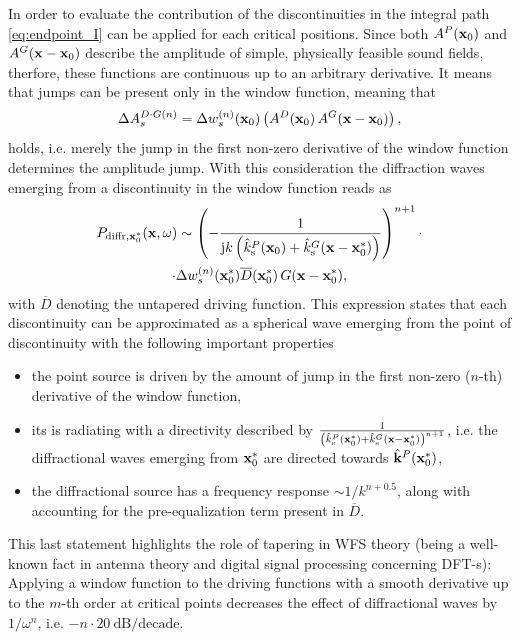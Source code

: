 \documentclass[lettersize,journal]{IEEEtran}
\begin{document}
In order to evaluate the contribution of the discontinuities in the integral path \eqref{eq:endpoint_I} can be applied for each critical positions.
Since both $A^P(\mathbf{x}_0)$ and $A^G(\mathbf{x}-\mathbf{x}_0)$ describe the amplitude of simple, physically feasible sound fields, therfore, these functions are continuous up to an arbitrary derivative. 
It means that jumps can be present only in the window function, meaning that 
\begin{equation}
  \Delta A^{D\cdot G (n)}_s =  \Delta w^{(n)}_s(\mathbf{x}_0) \left( A^D(\mathbf{x}_0) \, A^G(\mathbf{x}-\mathbf{x}_0) \right),
\end{equation}
holds, i.e. merely the jump in the first non-zero derivative of the window function determines the amplitude jump.
With this consideration the diffraction waves emerging from a discontinuity in the window function reads as
\begin{multline}
  \small
  P_{\mathrm{diffr,\mathbf{x}_0^*}}(\mathbf{x},\omega) \sim\left( -\frac{1}{\mathrm{j} k \left(\hat{k}_\mathrm{s}^P(\mathbf{x}_0)+\hat{k}_\mathrm{s}^G(\mathbf{x}-\mathbf{x}_0^*)\right)} \right)^{n+1} \cdot \\ 
  \cdot \Delta w^{(n)}_s(\mathbf{x}_0^*) \overline{D}(\mathbf{x}_0^*) \, G(\mathbf{x}-\mathbf{x}_0^*)
  ,
  \label{eq:diffr_waves}
\end{multline}
with $\overline{D}$ denoting the untapered driving function.
This expression states that each discontinuity can be approximated as a spherical wave emerging from the point of discontinuity with the following important properties
\begin{itemize}
  \item the point source is driven by the amount of jump in the first non-zero ($n$-th) derivative of the window function,
  \item its is radiating with a directivity described by $\frac{1}{\left(\hat{k}_\mathrm{s}^P(\mathbf{x}_0^*)+\hat{k}_\mathrm{s}^G(\mathbf{x}-\mathbf{x}_0^*)\right)^{n+1}}$, i.e. the diffractional waves emerging from $\mathbf{x}_0^*$ are directed towards $\hat{\mathbf{k}}^P(\mathbf{x}_0^*)$,
  \item the diffractional source has a frequency response $\sim 1 / k^{n+0.5}$, along with accounting for the pre-equalization term present in $\overline{D}$.
\end{itemize}
This last statement highlights the role of tapering in WFS theory (being a well-known fact in antenna theory and digital signal processing concerning DFT-s):
Applying a window function to the driving functions with a smooth derivative up to the $m$-th order at critical points  decreases the effect of diffractional waves by $1/\omega^n$, i.e. $-n\cdot 20~\mathrm{dB}/\mathrm{decade}$. 
\end{document}
